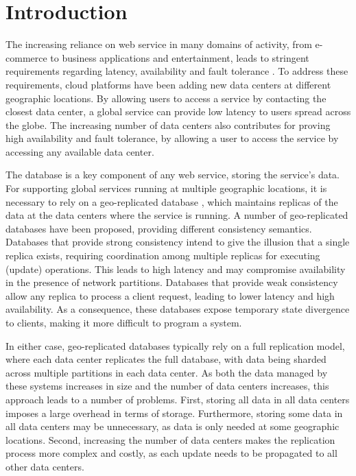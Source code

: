 \documentclass{vldb}
\begin{document}
\section{Introduction}


The increasing reliance on web service in many domains of activity, from e-commerce to business applications
and entertainment, leads to stringent requirements regarding latency, availability and fault tolerance \cite{Schurman2009latency,gomez}.
To address these requirements, cloud platforms have been adding new data centers at different geographic 
locations. By allowing users to access a service by contacting the closest data center, a global service can
provide low latency to users spread across the globe. The increasing number of data centers also contributes
for proving high availability and fault tolerance, by allowing a user to access the service by accessing any
available data center.


The database is a key component of any web service, storing the service's data. For supporting global
services running at multiple geographic locations, it is necessary to rely on a geo-replicated database \cite{dynamo},
which maintains replicas of the data at the data centers where the service is running.
A number of geo-replicated databases have been proposed, providing different consistency semantics.
Databases that provide strong consistency \cite{spanner,cockroachdb,mdcc} intend to give  the illusion that 
a single replica exists, requiring coordination among
multiple replicas for executing (update) operations. This leads to high latency and may compromise 
availability in the presence of network partitions.
Databases that provide weak consistency \cite{eventual,dynamo,cops} allow any replica to process a
client request, leading to lower latency and high availability. As a consequence, these databases expose
temporary state divergence to clients, making it more difficult to program a system. 

In either case, geo-replicated databases typically rely on a full replication model, where each data 
center replicates the full database, with data being sharded across multiple partitions in each data 
center. 
As both the data managed by these systems increases in size and the number of data centers increases,
this approach leads to a number of problems.
First, storing all data in all data centers imposes a large overhead in terms of storage. 
Furthermore, storing some data in all data centers may be unnecessary, as data is only needed at some
geographic locations.
Second, increasing the number of data centers makes the replication process more complex and costly, 
as each update needs to be propagated to all other data centers.
\end{document}
